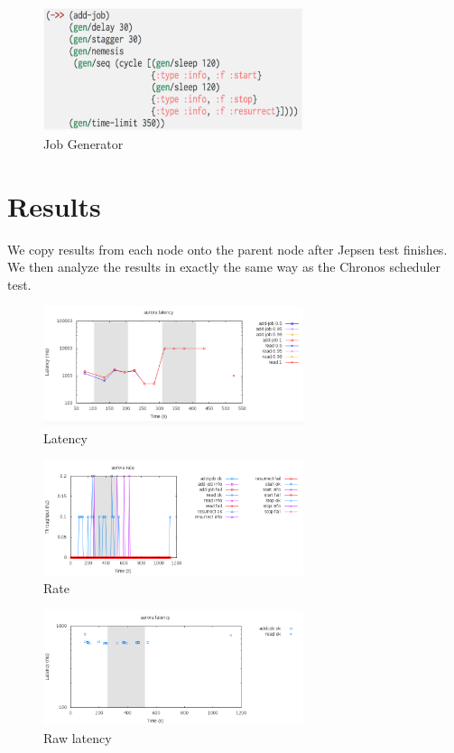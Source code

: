 \documentclass[letterpaper,twocolumn,10pt]{article}
\begin{document}
\begin{figure}
\centering
\includegraphics[width=3in]{jobGenerator}
\caption{Job Generator}
\label{fig:my_label}
\end{figure}

\section{Results}
We copy results from each node onto the parent node after Jepsen test finishes. We then analyze the results in exactly the same way as the Chronos scheduler test.


\begin{figure}
\centering
\includegraphics[width=3in]{latency}
\caption{Latency}
\label{fig:my_label}
\end{figure}

\begin{figure}
\centering
\includegraphics[width=3in]{rate}
\caption{Rate}
\label{fig:my_label}
\end{figure}

\begin{figure}
\centering
\includegraphics[width=3in]{latency-raw}
\caption{Raw latency}
\label{fig:my_label}
\end{figure}
\end{document}
